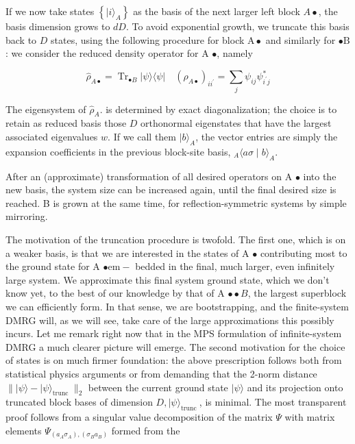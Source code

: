 \documentclass[12pt]{article}
\begin{document}
If we now take states $\left\{|i\rangle_{A}\right\}$ as the basis of the next larger left block $A \bullet$, the basis dimension grows to $d D$. To avoid exponential growth, we truncate this basis back to $D$ states, using the following procedure for block $\mathrm{A} \bullet$ and similarly for $\bullet \mathrm{B}$ : we consider the reduced density operator for A $\bullet$, namely


\begin{equation*}
\hat{\rho}_{A \bullet}=\operatorname{Tr}_{\bullet B}|\psi\rangle\langle\psi| \quad\left(\rho_{A \bullet}\right)_{i i^{\prime}}=\sum_{j} \psi_{i j} \psi_{i^{\prime} j}^{*} \tag{4}
\end{equation*}


The eigensystem of $\hat{\rho}_{A}$. is determined by exact diagonalization; the choice is to retain as reduced basis those $D$ orthonormal eigenstates that have the largest associated eigenvalues $w$. If we call them $|b\rangle_{A}$, the vector entries are simply the expansion coefficients in the previous block-site basis, ${ }_{A}\langle a \sigma \mid b\rangle_{A}$.

After an (approximate) transformation of all desired operators on A $\bullet$ into the new basis, the system size can be increased again, until the final desired size is reached. B is grown at the same time, for reflection-symmetric systems by simple mirroring.

The motivation of the truncation procedure is twofold. The first one, which is on a weaker basis, is that we are interested in the states of A $\bullet$ contributing most to the ground state for A $\bullet \mathrm{em}-$ bedded in the final, much larger, even infinitely large system. We approximate this final system ground state, which we don't know yet, to the best of our knowledge by that of A $\bullet \bullet B$, the largest superblock we can efficiently form. In that sense, we are bootstrapping, and the finite-system DMRG will, as we will see, take care of the large approximations this possibly incurs. Let me remark right now that in the MPS formulation of infinite-system DMRG a much clearer picture will emerge. The second motivation for the choice of states is on much firmer foundation: the above prescription follows both from statistical physics arguments or from demanding that the 2-norm distance $\||\psi\rangle-|\psi\rangle_{\text {trunc }} \|_{2}$ between the current ground state $|\psi\rangle$ and its projection onto truncated block bases of dimension $D,|\psi\rangle_{\text {trunc }}$, is minimal. The most transparent proof follows from a singular value decomposition of the matrix $\Psi$ with matrix elements $\Psi_{\left(a_{A} \sigma_{A}\right),\left(\sigma_{B} a_{B}\right)}$ formed from the
\end{document}
